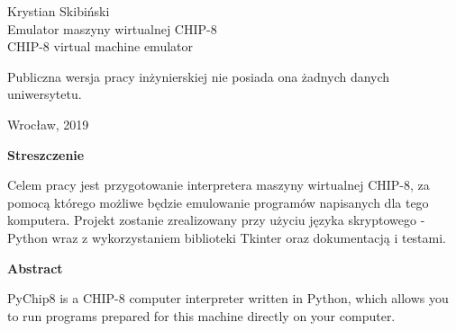 \documentclass[a4paper,12pt,reqno]{article}
\begin{document}
\begin{center}

\thispagestyle{empty}

\Large 
\vspace{0.8cm}
\vspace{1.8cm}

\Large Krystian Skibiński \\
\vspace{3.2cm}
\Large Emulator maszyny wirtualnej CHIP-8 \\
CHIP-8 virtual machine emulator
\end{center}
\vspace{15.7cm}
\begin{center}
\small Publiczna wersja pracy inżynierskiej nie posiada ona żadnych danych uniwersytetu.
\end{center}

\vspace{1.2cm}

\begin{center}
\large Wrocław, 2019
\end{center}

\newpage

\tableofcontents

\newpage

\begin{flushleft}
\Large \textbf{Streszczenie}
\end{flushleft}
\vspace{1cm}

 Celem pracy jest przygotowanie interpretera maszyny wirtualnej CHIP-8, za pomocą którego możliwe będzie emulowanie programów napisanych dla tego komputera. Projekt zostanie zrealizowany przy użyciu języka skryptowego - Python wraz z wykorzystaniem biblioteki Tkinter oraz dokumentacją i testami.

\newpage
\begin{flushleft}
\Large \textbf{Abstract}
\end{flushleft}
\vspace{1cm}

 PyChip8 is a CHIP-8 computer interpreter written in Python, which allows you to run programs prepared for this machine directly on your computer.

\newpage










\newpage



\end{document}
